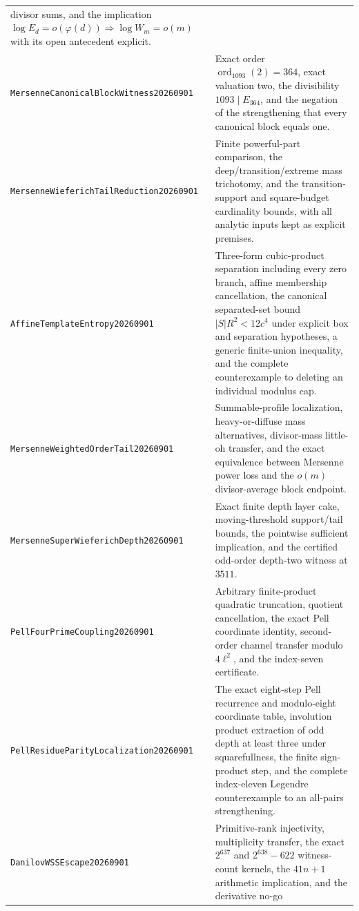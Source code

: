 \documentclass[11pt]{amsart}
\theoremstyle{definition}
\theoremstyle{remark}
\begin{document}
\begin{longtable}{>{\raggedright\arraybackslash}p{}>{\raggedright\arraybackslash}p{}}
divisor sums, and the implication $\log E_d=o(\varphi(d))\Rightarrow
\log W_m=o(m)$ with its open antecedent explicit.\\[3pt]
\texttt{MersenneCanonicalBlock\allowbreak Witness20260901} & Exact order
$\operatorname{ord}_{1093}(2)=364$, exact valuation two, the divisibility
$1093\mid E_{364}$, and the negation of the strengthening that every
canonical block equals one.\\[3pt]
\texttt{MersenneWieferichTail\allowbreak Reduction20260901} & Finite
powerful-part comparison, the deep/transition/extreme mass trichotomy, and
the transition-support and square-budget cardinality bounds, with all
analytic inputs kept as explicit premises.\\[3pt]
\texttt{AffineTemplate\allowbreak Entropy20260901} & Three-form
cubic-product separation including every zero branch, affine membership
cancellation, the canonical separated-set bound $|S|R^2<12c^4$ under explicit
box and separation hypotheses, a generic finite-union inequality, and the
complete counterexample to deleting an individual modulus cap.\\[3pt]
\texttt{MersenneWeightedOrder\allowbreak Tail20260901} & Summable-profile
localization, heavy-or-diffuse mass alternatives, divisor-mass little-oh
transfer, and the exact equivalence between Mersenne power loss and the
$o(m)$ divisor-average block endpoint.\\[3pt]
\texttt{MersenneSuperWieferich\allowbreak Depth20260901} & Exact finite
depth layer cake, moving-threshold support/tail bounds, the pointwise
sufficient implication, and the certified odd-order depth-two witness at
$3511$.\\[3pt]
\texttt{PellFourPrime\allowbreak Coupling20260901} & Arbitrary finite-product
quadratic truncation, quotient cancellation, the exact Pell coordinate
identity, second-order channel transfer modulo $4\ell^2$, and the index-seven
certificate.\\[3pt]
\texttt{PellResidueParity\allowbreak Localization20260901} & The exact
eight-step Pell recurrence and modulo-eight coordinate table, involution
product extraction of odd depth at least three under squarefullness, the
finite sign-product step, and the complete index-eleven Legendre
counterexample to an all-pairs strengthening.\\[3pt]
\texttt{DanilovWSS\allowbreak Escape20260901} & Primitive-rank injectivity,
multiplicity transfer, the exact $2^{637}$ and $2^{638}-622$ witness-count
kernels, the $41n+1$ arithmetic implication, and the derivative no-go

\end{longtable}
\end{document}
